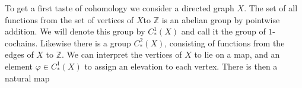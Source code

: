 To get a first taste of cohomology we consider a directed graph $X$. The set of all functions from the set of vertices of $X$to $\mathbb{Z}$ is an abelian group by pointwise addition. We will denote this group by $C^1_*(X)$ and call it the group of $1$-cochains. Likewise there is a group $C^2_*(X)$, consisting of functions from the edges of $X$ to $\mathbb{Z}$. We can interpret the vertices of $X$ to lie on a map, and an element $\varphi \in C^1_*(X)$ to assign an elevation to each vertex. There is then a natural map
